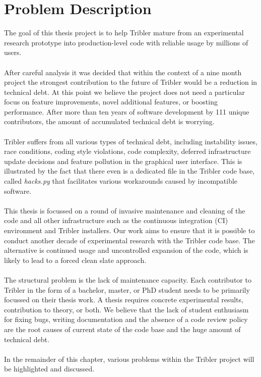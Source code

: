 \chapter{Problem Description}
\label{chapter:problem-description}
The goal of this thesis project is to help Tribler mature from an experimental research prototype into production-level code with reliable usage by millions of users.\\\\
After careful analysis it was decided that within the context of a nine month project the strongest contribution to the future of Tribler would be a reduction in technical debt. At this point we believe the project does not need a particular focus on feature improvements, novel additional features, or boosting performance. After more than ten years of software development by 111 unique contributors, the amount of accumulated technical debt is worrying.\\\\
Tribler suffers from all various types of technical debt, including instability issues, race conditions, coding style violations, code complexity, deferred infrastructure update decisions and feature pollution in the graphical user interface. This is illustrated by the fact that there even is a dedicated file in the Tribler code base, called \emph{hacks.py} that facilitates various workarounds caused by incompatible software.\\\\
This thesis is focussed on a round of invasive maintenance and cleaning of the code and all other infrastructure such as the continuous integration (CI) environment and Tribler installers. Our work aims to ensure that it is possible to conduct another decade of experimental research with the Tribler code base. The alternative is continued usage and uncontrolled expansion of the code, which is likely to lead to a forced clean slate approach.\\\\
The structural problem is the lack of maintenance capacity. Each contributor to Tribler in the form of a bachelor, master, or PhD student needs to be primarily focussed on their thesis work. A thesis requires concrete experimental results, contribution to theory, or both. We believe that the lack of student enthusiasm for fixing bugs, writing documentation and the absence of a code review policy are the root causes of current state of the code base and the huge amount of technical debt.\\\\
In the remainder of this chapter, various problems within the Tribler project will be highlighted and discussed.


